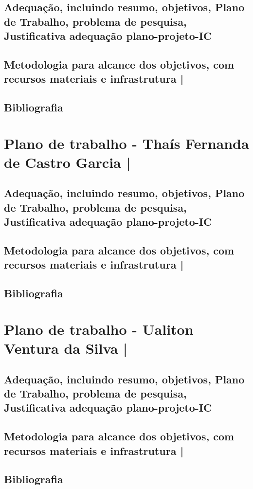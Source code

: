 \documentclass{article}
\begin{document}
\subsection{ Adequação, incluindo resumo, objetivos, Plano de Trabalho, problema de
pesquisa, Justificativa adequação plano-projeto-IC}
\subsection{Metodologia para alcance dos objetivos, com recursos materiais e infrastrutura |}
\subsection{Bibliografia}

\section{Plano de trabalho - Thaís Fernanda de Castro Garcia | }
\subsection{ Adequação, incluindo resumo, objetivos, Plano de Trabalho, problema de
pesquisa, Justificativa adequação plano-projeto-IC}
\subsection{Metodologia para alcance dos objetivos, com recursos materiais e infrastrutura |}
\subsection{Bibliografia}

\section{Plano de trabalho - Ualiton Ventura da Silva  | }
\subsection{ Adequação, incluindo resumo, objetivos, Plano de Trabalho, problema de
pesquisa, Justificativa adequação plano-projeto-IC}
\subsection{Metodologia para alcance dos objetivos, com recursos materiais e infrastrutura |}
\subsection{Bibliografia}
\end{document}

